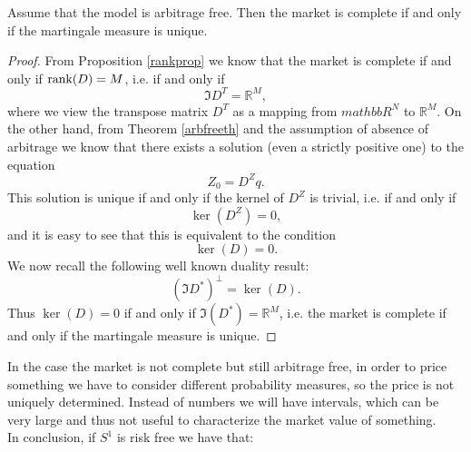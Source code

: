 \begin{theorem}
    Assume that the model is arbitrage free. Then the market is complete if and only if the martingale measure is unique.
\end{theorem}
\begin{proof}
    From Proposition \ref{rankprop} we know that the market is complete if and only if $\rank(D)=M$, i.e. if and only if
    \begin{equation*}
        \Im{D^T}=\mathbb{R}^M,
    \end{equation*}
    where we view the transpose matrix $D^T$ as a mapping from $mathbb{R}^N$ to $\mathbb{R}^M$. On the other hand, from Theorem \ref{arbfreeth} and the assumption of absence of arbitrage we know that there exists a solution (even a strictly positive one) to the equation
    \begin{equation*}
        Z_0=D^Zq.
    \end{equation*}
    This solution is unique if and only if the kernel of $D^Z$ is trivial, i.e. if and only if
    \begin{equation*}
        \ker(D^Z)=0,
    \end{equation*}
    and it is easy to see that this is equivalent to the condition
    \begin{equation*}
        \ker(D)=0.
    \end{equation*}
    We now recall the following well known duality result:
    \begin{equation*}
        (\Im{D^*})^{\perp}=\ker(D).
    \end{equation*}
    Thus $\ker(D) = 0$ if and only if $\Im(D^*)=\mathbb{R}^M$, i.e. the market is complete if and only if the martingale measure is unique.
\end{proof}
In the case the market is not complete but still arbitrage free, in order to price something we have to consider different probability measures, so the price is not uniquely determined. Instead of numbers we will have intervals, which can be very large and thus not useful to characterize the market value of something.\\
In conclusion, if $S^1$ is risk free we have that:
